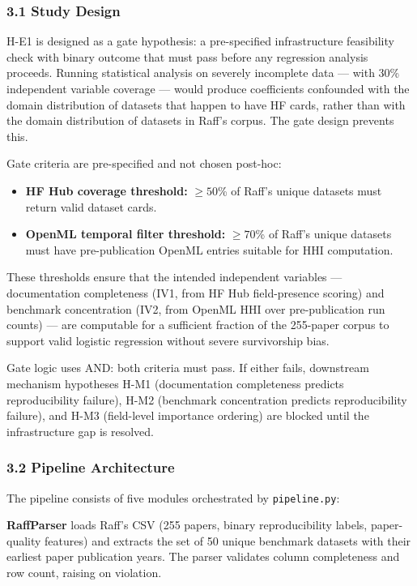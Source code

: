 
\subsubsection{3.1 Study Design}

H-E1 is designed as a gate hypothesis: a pre-specified infrastructure feasibility check with binary outcome that must pass before any regression analysis proceeds. Running statistical analysis on severely incomplete data --- with 30\% independent variable coverage --- would produce coefficients confounded with the domain distribution of datasets that happen to have HF cards, rather than with the domain distribution of datasets in Raff's corpus. The gate design prevents this.

Gate criteria are pre-specified and not chosen post-hoc:

\begin{itemize}
\item \textbf{HF Hub coverage threshold:} $\geq 50$\% of Raff's unique datasets must return valid dataset cards.
\item \textbf{OpenML temporal filter threshold:} $\geq 70$\% of Raff's unique datasets must have pre-publication OpenML entries suitable for HHI computation.
\end{itemize}

These thresholds ensure that the intended independent variables --- documentation completeness (IV1, from HF Hub field-presence scoring) and benchmark concentration (IV2, from OpenML HHI over pre-publication run counts) --- are computable for a sufficient fraction of the 255-paper corpus to support valid logistic regression without severe survivorship bias.

Gate logic uses AND: both criteria must pass. If either fails, downstream mechanism hypotheses H-M1 (documentation completeness predicts reproducibility failure), H-M2 (benchmark concentration predicts reproducibility failure), and H-M3 (field-level importance ordering) are blocked until the infrastructure gap is resolved.

\subsubsection{3.2 Pipeline Architecture}

The pipeline consists of five modules orchestrated by \texttt{pipeline.py}:

\textbf{RaffParser} loads Raff's CSV (255 papers, binary reproducibility labels, paper-quality features) and extracts the set of 50 unique benchmark datasets with their earliest paper publication years. The parser validates column completeness and row count, raising on violation.

